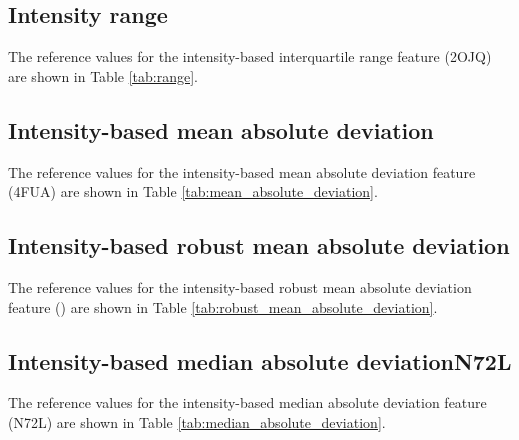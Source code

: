 \documentclass[fleqn,a4paper,oneside,openany]{book}
\newcommand\id[1]{{\hfill\normalsize{\idfont #1}}}
\newcommand\textid[1]{{\normalsize{\idfont #1}}}
\begin{document}
\begin{minipage}[l]{0.45\textwidth}

\end{minipage}
\quad
\begin{minipage}[r]{0.45\textwidth}

\end{minipage}
\FloatBarrier

\subsection{Intensity range}
The reference values for the intensity-based interquartile range feature (\textid{2OJQ}) are shown in Table \ref{tab:range}.

\subsection{Intensity-based mean absolute deviation}
The reference values for the intensity-based mean absolute deviation feature (\textid{4FUA}) are shown in Table \ref{tab:mean_absolute_deviation}.

\begin{minipage}[l]{0.45\textwidth}

\end{minipage}
\quad
\begin{minipage}[r]{0.45\textwidth}

\end{minipage}
\FloatBarrier

\subsection{Intensity-based robust mean absolute deviation}
The reference values for the intensity-based robust mean absolute deviation feature (\textid{1128}) are shown in Table \ref{tab:robust_mean_absolute_deviation}.

\subsection{Intensity-based median absolute deviation\id{N72L}}
The reference values for the intensity-based median absolute deviation feature (\textid{N72L}) are shown in Table \ref{tab:median_absolute_deviation}.

\begin{minipage}[l]{0.45\textwidth}

\end{minipage}
\quad
\begin{minipage}[r]{0.45\textwidth}

\end{minipage}
\FloatBarrier
\end{document}
